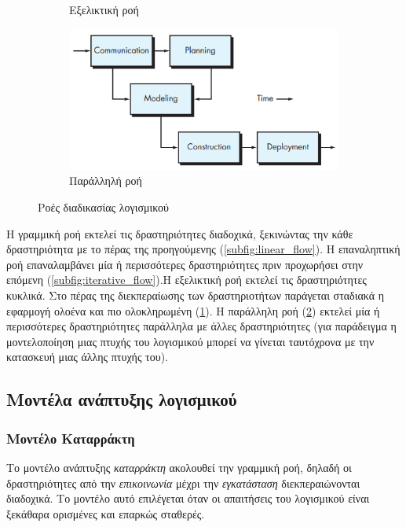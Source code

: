 \documentclass{report}
\begin{document}
\begin{figure}[h]
\begin{subfigure}{\linewidth}
        \caption{Εξελικτική ροή}
        \label{subfig:evolutionery_flow}
    \end{subfigure}
    \begin{subfigure}{\linewidth}
        \centering
        \includegraphics[width=0.7\linewidth]{images/software_engineering/parallel_process_flow.png}
        \caption{Παράλληλή ροή}
        \label{subfig:parallel_flow}
    \end{subfigure}
    \caption{Ροές διαδικασίας λογισμικού}
    \label{fig:software_process_flow}
\end{figure}

H γραμμική ροή εκτελεί τις δραστηριότητες διαδοχικά, ξεκινώντας την κάθε δραστηριότητα με το πέρας της προηγούμενης (\ref{subfig:linear_flow}). Η επαναληπτική ροή επαναλαμβάνει μία ή περισσότερες δραστηριότητες πριν προχωρήσει στην επόμενη (\ref{subfig:iterative_flow}).H εξελικτική ροή εκτελεί τις δραστηριότητες κυκλικά. Στο πέρας της διεκπεραίωσης των δραστηριοτήτων παράγεται σταδιακά η εφαρμογή ολοένα και πιο ολοκληρωμένη (\ref{subfig:evolutionery_flow}). Η παράλληλη ροή (\ref{subfig:parallel_flow}) εκτελεί μία ή περισσότερες δραστηριότητες παράλληλα με άλλες δραστηριότητες (για παράδειγμα η μοντελοποίηση μιας πτυχής του λογισμικού μπορεί να γίνεται ταυτόχρονα με την κατασκευή μιας άλλης πτυχής του).

\subsection{Μοντέλα ανάπτυξης λογισμικού}

\subsubsection{Μοντέλο Καταρράκτη}

Το μοντέλο ανάπτυξης \textsl{καταρράκτη} ακολουθεί την γραμμική ροή, δηλαδή οι δραστηριότητες από την \textsl{επικοινωνία} μέχρι την \textsl{εγκατάσταση} διεκπεραιώνονται διαδοχικά. Το μοντέλο αυτό επιλέγεται όταν οι απαιτήσεις του λογισμικού είναι ξεκάθαρα ορισμένες και επαρκώς σταθερές.
\end{document}
